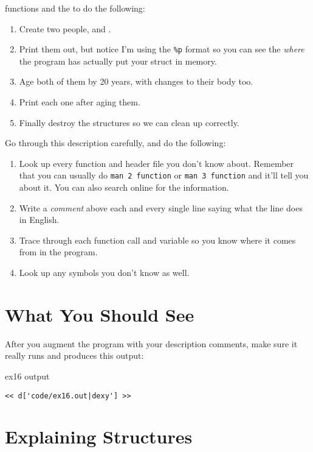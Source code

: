 \begin{description}
    functions and the  to do the following:
    \begin{enumerate}
    \item Create two people,  and .
    \item Print them out, but notice I'm using the \verb|%p| 
        format so you can see the \emph{where} the program
        has actually put your struct in memory.
    \item Age both of them by 20 years, with changes to their
        body too.
    \item Print each one after aging them.
    \item Finally destroy the structures so we can clean up 
        correctly.
    \end{enumerate}
\end{description}

Go through this description carefully, and do the following:

\begin{enumerate}
\item Look up every function and header file you don't know about.
    Remember that you can usually do \verb|man 2 function| or
    \verb|man 3 function| and it'll tell you about it.  You can also
    search online for the information.
\item Write a \emph{comment} above each and every single line saying
    what the line does in English.
\item Trace through each function call and variable so you know where
    it comes from in the program.
\item Look up any symbols you don't know as well.
\end{enumerate}


\section{What You Should See}

After you augment the program with your description comments,
make sure it really runs and produces this output:

\begin{code}{ex16 output}
\begin{lstlisting}
<< d['code/ex16.out|dexy'] >>
\end{lstlisting}
\end{code}

\section{Explaining Structures}

